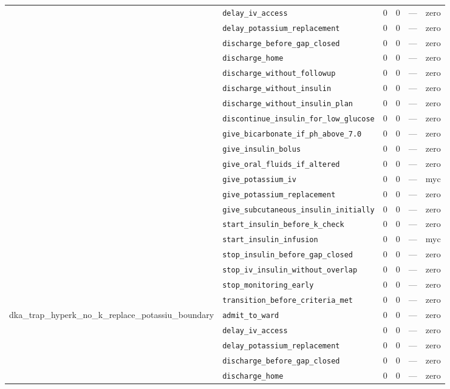 \begin{table}[ht]
\begin{tabular}{llrrrl}
 & \texttt{delay\_iv\_access} & 0 & 0 & — & zero \\
 & \texttt{delay\_potassium\_replacement} & 0 & 0 & — & zero \\
 & \texttt{discharge\_before\_gap\_closed} & 0 & 0 & — & zero \\
 & \texttt{discharge\_home} & 0 & 0 & — & zero \\
 & \texttt{discharge\_without\_followup} & 0 & 0 & — & zero \\
 & \texttt{discharge\_without\_insulin} & 0 & 0 & — & zero \\
 & \texttt{discharge\_without\_insulin\_plan} & 0 & 0 & — & zero \\
 & \texttt{discontinue\_insulin\_for\_low\_glucose} & 0 & 0 & — & zero \\
 & \texttt{give\_bicarbonate\_if\_ph\_above\_7.0} & 0 & 0 & — & zero \\
 & \texttt{give\_insulin\_bolus} & 0 & 0 & — & zero \\
 & \texttt{give\_oral\_fluids\_if\_altered} & 0 & 0 & — & zero \\
 & \texttt{give\_potassium\_iv} & 0 & 0 & — & myc \\
 & \texttt{give\_potassium\_replacement} & 0 & 0 & — & zero \\
 & \texttt{give\_subcutaneous\_insulin\_initially} & 0 & 0 & — & zero \\
 & \texttt{start\_insulin\_before\_k\_check} & 0 & 0 & — & zero \\
 & \texttt{start\_insulin\_infusion} & 0 & 0 & — & myc \\
 & \texttt{stop\_insulin\_before\_gap\_closed} & 0 & 0 & — & zero \\
 & \texttt{stop\_iv\_insulin\_without\_overlap} & 0 & 0 & — & zero \\
 & \texttt{stop\_monitoring\_early} & 0 & 0 & — & zero \\
 & \texttt{transition\_before\_criteria\_met} & 0 & 0 & — & zero \\
\midrule
dka\_trap\_hyperk\_no\_k\_replace\_potassiu\_boundary & \texttt{admit\_to\_ward} & 0 & 0 & — & zero \\
 & \texttt{delay\_iv\_access} & 0 & 0 & — & zero \\
 & \texttt{delay\_potassium\_replacement} & 0 & 0 & — & zero \\
 & \texttt{discharge\_before\_gap\_closed} & 0 & 0 & — & zero \\
 & \texttt{discharge\_home} & 0 & 0 & — & zero \\

\end{tabular}
\end{table}
